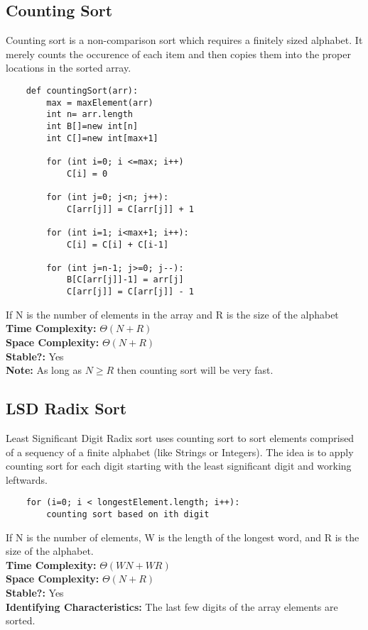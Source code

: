 \documentclass{article}
\begin{document}
\subsection{Counting Sort}
Counting sort is a non-comparison sort which requires a finitely sized alphabet.
It merely counts the occurence of each item and then copies them into the proper locations in the sorted array.
\begin{lstlisting}
    def countingSort(arr):
        max = maxElement(arr)
        int n= arr.length
        int B[]=new int[n]
        int C[]=new int[max+1]

        for (int i=0; i <=max; i++)
            C[i] = 0

        for (int j=0; j<n; j++):
            C[arr[j]] = C[arr[j]] + 1
    
        for (int i=1; i<max+1; i++):
            C[i] = C[i] + C[i-1]

        for (int j=n-1; j>=0; j--):
            B[C[arr[j]]-1] = arr[j]
            C[arr[j]] = C[arr[j]] - 1
\end{lstlisting}
If N is the number of elements in the array and R is the size of the alphabet
\textbf{Time Complexity: } $\Theta(N + R)$\\
\textbf{Space Complexity: } $\Theta(N + R)$\\
\textbf{Stable?: } Yes\\
\textbf{Note: } As long as $N \ge R$ then counting sort will be very fast.
\subsection{LSD Radix Sort}
Least Significant Digit Radix sort uses counting sort to sort elements comprised of a sequency of a finite alphabet (like Strings or Integers).
The idea is to apply counting sort for each digit starting with the least significant digit and working leftwards.
\begin{lstlisting}
    for (i=0; i < longestElement.length; i++):
        counting sort based on ith digit
\end{lstlisting}
If N is the number of elements, W is the length of the longest word, and R is the size of the alphabet.\\
\textbf{Time Complexity: } $\Theta(WN + WR)$\\
\textbf{Space Complexity: } $\Theta(N + R)$\\
\textbf{Stable?: } Yes\\
\textbf{Identifying Characteristics: } The last few digits of the array elements are sorted.
\end{document}
